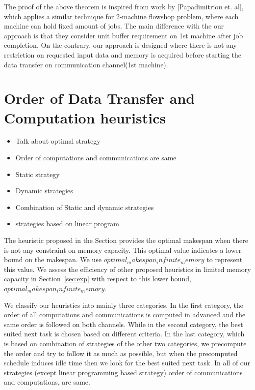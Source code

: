 \documentclass[runningheads]{llncs} %
\begin{document}
The proof of the above theorem is inspired from work by [Papadimitriou et. al], which applies a similar 
technique for 2-machine flowshop problem, where each machine can hold fixed amount of jobs. The 
main difference with the our approach is that they consider unit buffer requirement on 1st machine 
after job completion. On the contrary, our approach is designed where there is not any restriction on 
requested input data and memory is acquired before starting the data transfer on communication 
channel(1st machine).





	
	
	\section{Order of Data Transfer and Computation heuristics}
	\begin{itemize}
		\item Talk about optimal strategy
		\item Order of computations and communications are same
		\item Static strategy
		\item Dynamic strategies
		\item Combination of Static and dynamic strategies
		\item strategies based on linear program 
	\end{itemize}

The heuristic proposed in the Section provides the optimal makespan when there is not any constraint on memory capacity. This optimal value indicates a lower bound on the makespan. We use $optimal_makespan_infinite_memory$ to represent this value. We assess the efficiency of other proposed heuristics in limited memory capacity in Section~\ref{sec:exp} with respect to this lower bound, $optimal_makespan_infinite_memory$.


We classify our heuristics into mainly three categories. In the first category, the order of all computations and communications is computed in advanced and the same order is followed on both channels. While in the second category, the best suited next task is chosen based on different criteria. In the last category, which is based on combination of strategies of the other two categories, we precompute the order and try to follow it as much as possible, but when the precomputed schedule induces idle time then we look for the best suited next task. In all of our strategies (except linear programming based strategy) order of communications and computations, are same.
\end{document}
